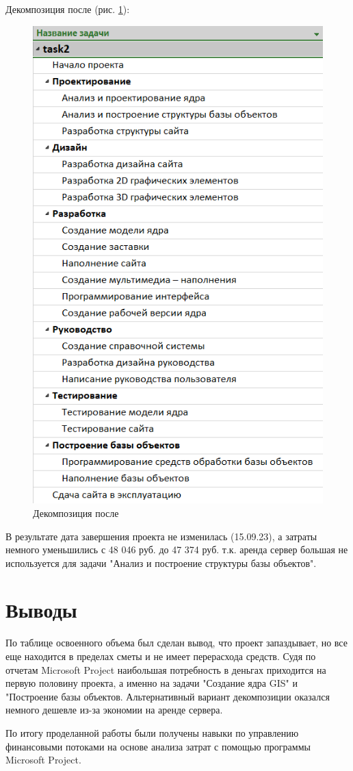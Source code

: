 \newpage
Декомпозиция после (рис. \ref{p7}):
\begin{figure}[!h]
	\centering
	\includegraphics[width=0.7\linewidth]{inc/img/7.png}
	\caption{Декомпозиция после}
	\label{p7}
\end{figure}

В результате дата завершения проекта не изменилась (15.09.23), а затраты немного уменьшились с 48 046 руб. до 47 374 руб. т.к. аренда сервер большая не используется для задачи "Анализ и построение структуры базы объектов".

\section*{Выводы}
По таблице освоенного объема был сделан вывод, что проект запаздывает, но все еще находится в пределах сметы и не имеет перерасхода средств. Судя по отчетам Microsoft Project наибольшая потребность в деньгах приходится на первую половину проекта, а именно на задачи "Создание ядра GIS" и "Построение базы объектов. Альтернативный вариант декомпозиции оказался немного дешевле из-за экономии на аренде сервера.

По итогу проделанной работы были получены навыки по управлению финансовыми потоками на основе анализа затрат с помощью программы Microsoft Project.